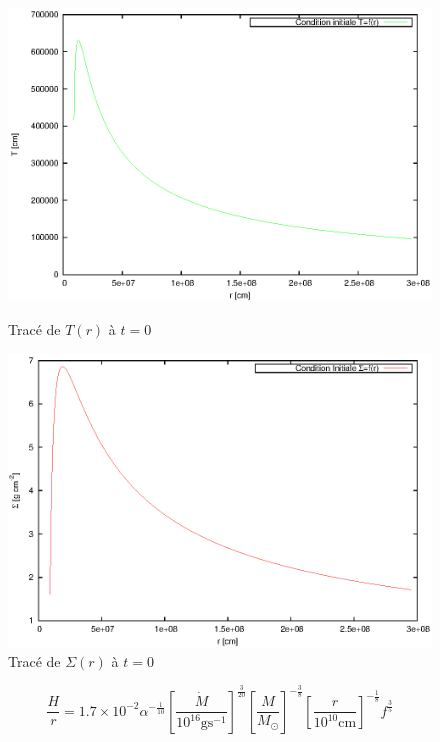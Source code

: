 \documentclass[french]{beamer}
\begin{document}
\begin{frame}
 \begin{figure}[ht]
   \begin{minipage}[c]{.46\linewidth}
      \includegraphics[scale=0.4]{ic_T.eps}
      \caption{Tracé de $T(r)$ à $t = 0$}
   \end{minipage} \hfill
   \begin{minipage}[c]{.46\linewidth}
      \includegraphics[scale=0.4]{ic_Sig.eps}
      \caption{Tracé de $\Sigma(r)$ à $t = 0$}
   \end{minipage}
\end{figure} 
\end{frame}

\begin{frame}
	\begin{equation*}
	\frac{H}{r} = 1.7 \times 10^{-2}\alpha^{- \frac{1}{10}} \left[ \frac{\dot{M}}{10^{16} \mbox{g} \mbox{s}^{-1}} \right]^{\frac{3}{20}} \left[ \frac{M}{M_\odot}\right]^{- \frac{3}{8}} \left[ \frac{r}{10^{10} \mathrm{cm}}\right]^{- \frac{1}{8}} f^{\frac{3}{5}}
\end{equation*}
\end{frame}
\end{document}
